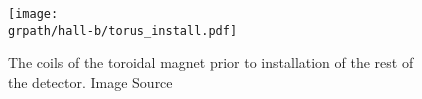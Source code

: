 \begin{figure}\begin{center}
\texttt{[image: \\grpath/hall-b/torus\_install.pdf]}
\caption[The coils of the  toroidal magnet prior to installation of the rest of the detector]{\label{fig:torusinstall}{}The coils of the  toroidal magnet prior to installation of the rest of the detector. Image Source~\cite{williams}}
\end{center}\end{figure}
\FloatBarrier








